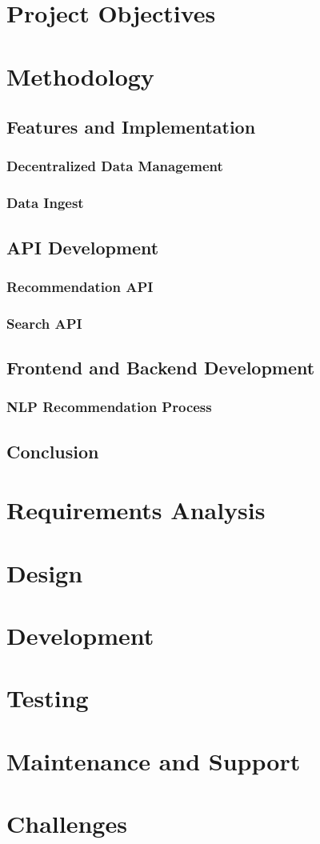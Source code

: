 \documentclass{article}
\begin{document}
\section{Project Objectives}
\section{Methodology}
\subsection{Features and Implementation}
\subsubsection{Decentralized Data Management}
\subsubsection{Data Ingest}
\subsection{API Development}
\subsubsection{Recommendation API}
\subsubsection{Search API}
\subsection{Frontend and Backend Development}
\subsubsection{NLP Recommendation Process}
\subsection{Conclusion}
\section{Requirements Analysis}
\section{Design}
\section{Development}
\section{Testing}
\section{Maintenance and Support}
\section{Challenges}
\end{document}
